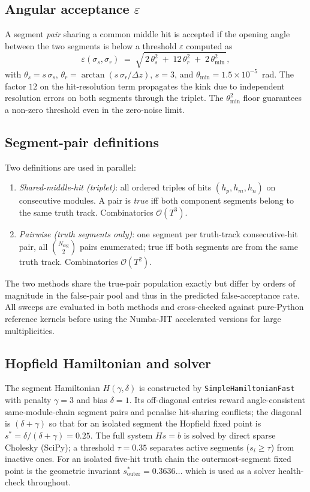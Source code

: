 \documentclass[11pt,a4paper]{article}
\newcommand{\sss}{\sigma_s}
\newcommand{\srr}{\sigma_r}
\newcommand{\eps}{\varepsilon}
\begin{document}
\subsection{Angular acceptance $\eps$}
A segment \emph{pair} sharing a common middle hit is accepted if the
opening angle between the two segments is below a threshold $\eps$
computed as
\begin{equation}
  \eps(\sss,\srr) \;=\; \sqrt{\,2\,\theta_s^2 \;+\; 12\,\theta_r^2 \;+\; 2\,\theta_\mathrm{min}^2\,},
  \label{eq:eps}
\end{equation}
with $\theta_s = s\,\sss$, $\theta_r = \arctan(s\,\srr/\Delta z)$,
$s = 3$, and $\theta_\mathrm{min} = 1.5\times 10^{-5}$~rad.
The factor $12$ on the hit-resolution term propagates the kink due to
independent resolution errors on both segments through the triplet.
The $\theta_\mathrm{min}^2$ floor guarantees a non-zero threshold even
in the zero-noise limit.

\subsection{Segment-pair definitions}
Two definitions are used in parallel:
\begin{enumerate}
  \item \emph{Shared-middle-hit (triplet)}:
        all ordered triples of hits $(h_{p},h_{m},h_{n})$ on
        consecutive modules. A pair is \emph{true} iff both
        component segments belong to the same truth track. Combinatorics
        $\mathcal{O}(T^3)$.
  \item \emph{Pairwise (truth segments only)}:
        one segment per truth-track consecutive-hit pair, all
        $\binom{N_\mathrm{seg}}{2}$ pairs enumerated; true iff both
        segments are from the same truth track. Combinatorics
        $\mathcal{O}(T^2)$.
\end{enumerate}
The two methods share the true-pair population exactly but differ by
orders of magnitude in the false-pair pool and thus in the predicted
false-acceptance rate. All sweeps are evaluated in both methods and
cross-checked against pure-Python reference kernels before using the
Numba-JIT \cite{Lam:2015:numba} accelerated versions for large
multiplicities.

\subsection{Hopfield Hamiltonian and solver}
The segment Hamiltonian $H(\gamma,\delta)$ is constructed by
\texttt{SimpleHamiltonianFast} with penalty $\gamma = 3$ and bias
$\delta = 1$. Its off-diagonal entries reward angle-consistent
same-module-chain segment pairs and penalise hit-sharing conflicts;
the diagonal is $(\delta+\gamma)$ so that for an isolated segment the
Hopfield fixed point is $s^\ast = \delta/(\delta+\gamma) = 0.25$. The
full system $H s = b$ is solved by direct sparse Cholesky
(SciPy); a threshold $\tau = 0.35$ separates active segments ($s_i
\geq \tau$) from inactive ones. For an isolated five-hit truth chain
the outermost-segment fixed point is the geometric invariant
$s^\ast_\mathrm{outer} = 0.3636\ldots$ which is used as a solver
health-check throughout.
\end{document}
